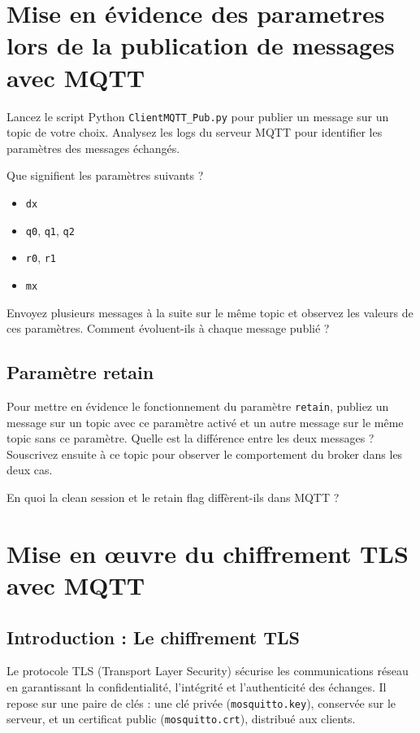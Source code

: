 \documentclass{article}
\begin{document}
\section{Mise en évidence des parametres lors de la publication de messages avec MQTT}

Lancez le script Python \texttt{ClientMQTT\_Pub.py} pour publier un message sur un topic de votre choix. Analysez les logs du serveur MQTT pour identifier les paramètres des messages échangés.

Que signifient les paramètres suivants ?
\begin{itemize}
    \item \texttt{dx}
    \item \texttt{q0}, \texttt{q1}, \texttt{q2}
    \item \texttt{r0}, \texttt{r1}
    \item \texttt{mx}
\end{itemize}

Envoyez plusieurs messages à la suite sur le même topic et observez les valeurs de ces paramètres. Comment évoluent-ils à chaque message publié ?


\subsection{Paramètre retain}

Pour mettre en évidence le fonctionnement du paramètre \texttt{retain}, publiez un message sur un topic avec ce paramètre activé
et un autre message sur le même topic sans ce paramètre. Quelle est la différence entre les deux messages ?
Souscrivez ensuite à ce topic pour observer le comportement du broker dans les deux cas.

\bigskip
\noindent
En quoi la clean session et le retain flag diffèrent-ils dans MQTT ?

\section{Mise en œuvre du chiffrement TLS avec MQTT}

\subsection{Introduction : Le chiffrement TLS}

Le protocole TLS (Transport Layer Security) sécurise les communications réseau en garantissant la confidentialité, l'intégrité et l'authenticité des échanges. Il repose sur une paire de clés : une clé privée (\texttt{mosquitto.key}), conservée sur le serveur, et un certificat public (\texttt{mosquitto.crt}), distribué aux clients.
\end{document}
